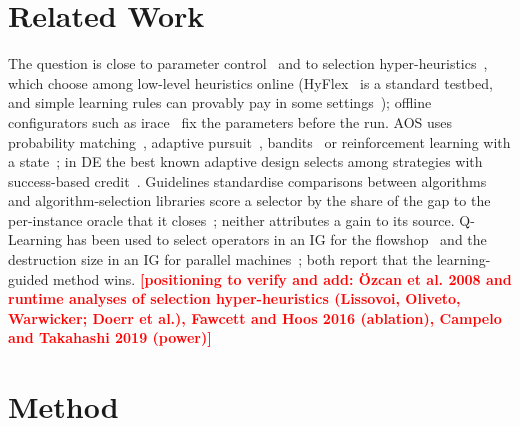 \documentclass[conference,a4paper]{IEEEtran}
\newif\ifdraftmarks \draftmarkstrue
\newcommand{\todonote}[1]{\ifdraftmarks\textcolor{red}{\textbf{[#1]}}\fi}
\begin{document}
\section{Related Work}
The question is close to parameter control~\cite{KarafotiasEtal2015,AletiMoser2016} and to selection hyper-heuristics~\cite{BurkeEtal2013}, which choose among low-level heuristics online (HyFlex~\cite{OchoaEtal2012} is a standard testbed, and simple learning rules can provably pay in some settings~\cite{AlanaziLehre2014}); offline configurators such as irace~\cite{LopezIbanezEtal2016} fix the parameters before the run.
AOS uses probability matching~\cite{Goldberg1990}, adaptive pursuit~\cite{Thierens2005}, bandits~\cite{AuerEtal2002,DaCostaEtal2008} or reinforcement learning with a state~\cite{SharmaEtal2019}; in DE the best known adaptive design selects among strategies with success-based credit~\cite{QinEtal2009}.
Guidelines standardise comparisons between algorithms~\cite{BartzBeielsteinEtal2020} and algorithm-selection libraries score a selector by the share of the gap to the per-instance oracle that it closes~\cite{Rice1976,BischlEtal2016}; neither attributes a gain to its source.
Q-Learning has been used to select operators in an IG for the flowshop~\cite{KarimiMamaghanEtal2023} and the destruction size in an IG for parallel machines~\cite{MissaouiOSullivan2026}; both report that the learning-guided method wins.
\todonote{positioning to verify and add: \"Ozcan et al. 2008 and runtime analyses of selection hyper-heuristics (Lissovoi, Oliveto, Warwicker; Doerr et al.), Fawcett and Hoos 2016 (ablation), Campelo and Takahashi 2019 (power)}

\section{Method}
\end{document}
